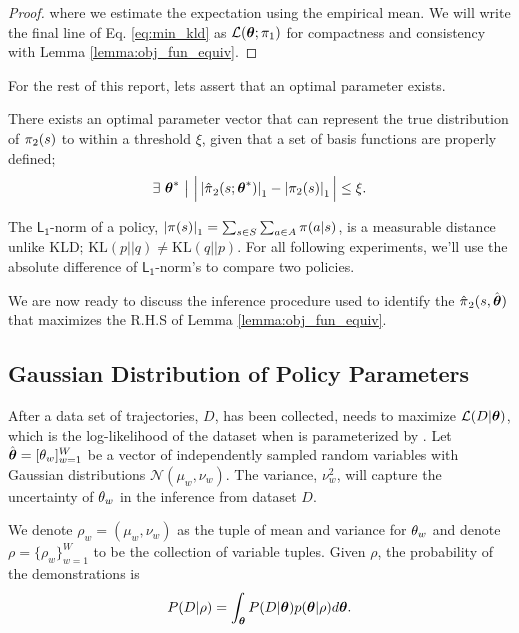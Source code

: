 \begin{proof}
        \noindent
        where we estimate the expectation using the empirical mean. We will write the final line of Eq.
        \ref{eq:min_kld} as $\mathcal{L}(\boldsymbol{\mathbb{\theta}}; \pi_{1})$ for compactness and consistency with Lemma
        \ref{lemma:obj_fun_equiv}.

    \end{proof}

    For the rest of this report, lets assert that an optimal parameter exists.
    \begin{assumption}\label{assump:opt_policy_err}
        There exists an optimal parameter vector that can represent the true distribution of $\pi_{2}(s)$ to within a
        threshold $\xi$, given that a set of basis functions are properly defined;
        \[
        \exists\ \boldsymbol{\mathbb{\theta}}^*\ \big|\ \Big| \left|\hat{\pi_{}}_2(s;\boldsymbol{\mathbb{\theta}}^*)\right|_1 -
            \left|\pi_{2}(s)\right|_1 \Big| \leq \xi.
        \]
    \end{assumption}

    \noindent
    The $\mathsf{L_1}$-norm of a policy, $\left|\pi_{}(s)\right|_1 = \sum_{s \in S}\sum_{a \in A}\pi_{}(a|s)$, is a
    measurable distance unlike \ac{KLD}; $\text{KL}(p||q) \neq \text{KL}(q||p)$. For all following experiments, we'll
    use the absolute difference of $\mathsf{L_1}$-norm's to compare two policies.

    We are now ready to discuss the inference procedure used to identify the $\hat{\pi_{}}_2(s,
    \hat{\boldsymbol{\mathbb{\theta}}})$ that maximizes the R.H.S of Lemma \ref{lemma:obj_fun_equiv}.


\subsection{Gaussian Distribution of Policy Parameters}\label{sec:gauss_policy}

    After a data set of trajectories, $D$, has been collected,  needs to maximize $\mathcal{L}(D|\boldsymbol{\mathbb{\theta}})$,
    which is the log-likelihood of the dataset when  is parameterized by \paramVec. Let $\hat{\boldsymbol{\mathbb{\theta}}}
    = [ \theta_{w}]_{w=1}^W$ be a vector of independently sampled random variables with Gaussian distributions
    $\mathcal{N}(\mu_w, \nu_w)$. The variance, $\nu_w^2$, will capture the uncertainty of $\theta_{w}$ in the inference
    from dataset $D$.

    We denote $\rho_w = (\mu_w, \nu_w)$ as the tuple of mean and variance for $\theta_{w}$ and denote $\rho
    =\{\rho_w\}_{w=1}^W$ to be the collection of variable tuples. Given $\rho$, the probability of the demonstrations
    is
    \[
    P(D |\rho) = \int_{\boldsymbol{\mathbb{\theta}} } P(D|\boldsymbol{\mathbb{\theta}}) p(\boldsymbol{\mathbb{\theta}} | \rho)d\boldsymbol{\mathbb{\theta}}.
    \]

